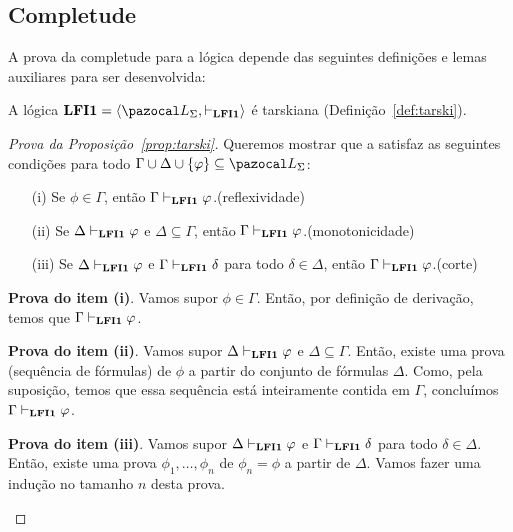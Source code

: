     \subsection{Completude}\label{sec:comp}
        A prova da completude para a lógica \lfium{} depende das seguintes definições e lemas auxiliares para ser desenvolvida:

        \begin{proposicao}\label{prop:tarski}        
            A lógica $\lfium{} = \langle \ling, \conhil \rangle$ é tarskiana (Definição~\ref{def:tarski}).
        \end{proposicao}

        \begin{proof}[Prova da Proposição~\ref{prop:tarski}]
            Queremos mostrar que a \lfium{} satisfaz as seguintes condições para todo $\Gamma \cup \Delta \cup \{\phi\} \subseteq \ling{}$:
            \begin{itemize}
                \item [(i)] Se $\phi \in \Gamma$, então $\Gamma \vdash_{{\normalfont\textbf{LFI1}}{}} \varphi$.\hfill(reflexividade)
                \item [(ii)] Se $\Delta \vdash_{{\normalfont\textbf{LFI1}}{}} \varphi$ e $\Delta \subseteq \Gamma$, então $\Gamma \vdash_{{\normalfont\textbf{LFI1}}{}} \varphi$.\hfill(monotonicidade)
                \item [(iii)] Se $\Delta \vdash_{{\normalfont\textbf{LFI1}}{}} \varphi$ e $\Gamma \vdash_{{\normalfont\textbf{LFI1}}{}} \delta$ para todo $\delta \in \Delta$, então $\Gamma \vdash_{{\normalfont\textbf{LFI1}}{}} \varphi$.\hfill(corte)
            \end{itemize}
            \begin{adjustwidth}{1cm}{}
                \textbf{Prova do item (i)}. Vamos supor $\phi \in \Gamma$. Então, por definição de derivação, temos que $\Gamma \vdash_{{\normalfont\textbf{LFI1}}{}} \varphi$.

                \noindent{}\textbf{Prova do item (ii)}. Vamos supor $\Delta \vdash_{{\normalfont\textbf{LFI1}}{}} \varphi$ e $\Delta \subseteq \Gamma$. Então, existe uma prova (sequência de fórmulas) de $\phi$ a partir do conjunto de fórmulas $\Delta$. Como, pela suposição, temos que essa sequência está inteiramente contida em $\Gamma$, concluímos $\Gamma \vdash_{{\normalfont\textbf{LFI1}}{}} \varphi$.
                
                \noindent{}\textbf{Prova do item (iii)}. Vamos supor $\Delta \vdash_{{\normalfont\textbf{LFI1}}{}} \varphi$ e $\Gamma \vdash_{{\normalfont\textbf{LFI1}}{}} \delta$ para todo $\delta \in \Delta$. Então, existe uma prova $\phi_1, \ldots, \phi_n$ de $\phi_n = \phi$ a partir de $\Delta$. Vamos fazer uma indução no tamanho $n$ desta prova.
                

\end{adjustwidth}
\end{proof}
